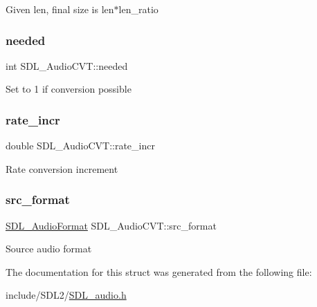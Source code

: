Given len, final size is len$\ast$len\+\_\+ratio \mbox{\label{struct_s_d_l___audio_c_v_t_ac600a035a48df05e14d3712fd6953ad4}} 
\subsubsection{\texorpdfstring{needed}{needed}}
{\footnotesize\ttfamily int S\+D\+L\+\_\+\+Audio\+C\+V\+T\+::needed}

Set to 1 if conversion possible \mbox{\label{struct_s_d_l___audio_c_v_t_ad886122c23a6673073baace31bff3b6c}} 
\subsubsection{\texorpdfstring{rate\+\_\+incr}{rate\_incr}}
{\footnotesize\ttfamily double S\+D\+L\+\_\+\+Audio\+C\+V\+T\+::rate\+\_\+incr}

Rate conversion increment \mbox{\label{struct_s_d_l___audio_c_v_t_a6ae81231e017105e6d5e745a51732e16}} 
\subsubsection{\texorpdfstring{src\+\_\+format}{src\_format}}
{\footnotesize\ttfamily \hyperlink{_s_d_l__audio_8h_a491ed103fd25d920c4e6b7495217ce66}{S\+D\+L\+\_\+\+Audio\+Format} S\+D\+L\+\_\+\+Audio\+C\+V\+T\+::src\+\_\+format}

Source audio format 

The documentation for this struct was generated from the following file\+:\begin{DoxyCompactItemize}
\item 
include/\+S\+D\+L2/\hyperlink{_s_d_l__audio_8h}{S\+D\+L\+\_\+audio.\+h}\end{DoxyCompactItemize}
